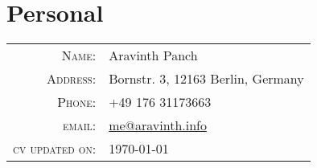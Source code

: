 \section{Personal}
\begin{tabular}
	{rl}
	\textsc{Name:} &  Aravinth Panch \\
	\textsc{Address:} & Bornstr. 3, 12163 Berlin, Germany\\
	\textsc{Phone:} & +49 176 31173663\\
	\textsc{email:} & \href{mailto:me@aravinth.info}{me@aravinth.info} \\
	\textsc{cv updated on:} & \today\\
\end{tabular}
